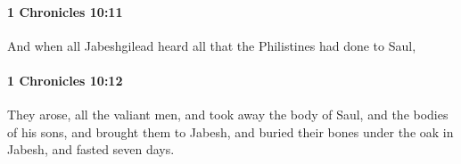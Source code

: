 		\paragraph{1 Chronicles 10:11} %
			\label{1CHRONICLES-10-11}

			And when all Jabeshgilead heard all that the Philistines had done to Saul,


		\paragraph{1 Chronicles 10:12} %
			\label{1CHRONICLES-10-12}

			They arose, all the valiant men, and took away the body of Saul, and the bodies of his sons, and brought them to Jabesh, and buried their bones under the oak in Jabesh, and fasted seven days.


